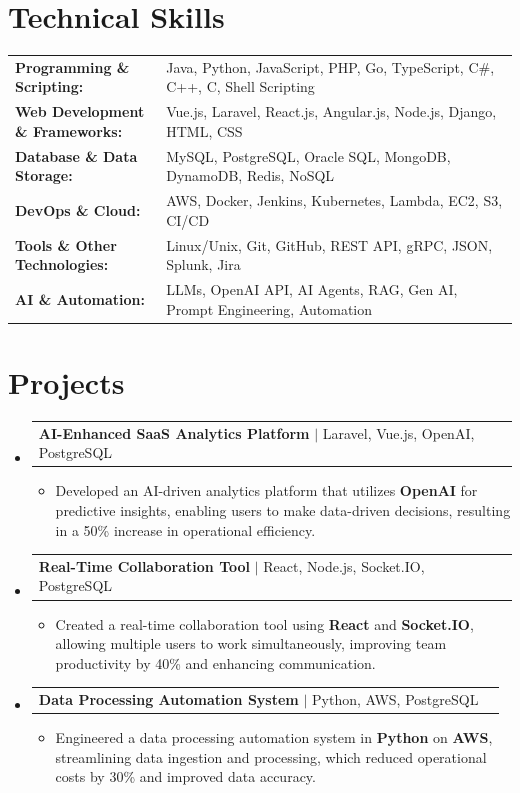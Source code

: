 \documentclass[letterpaper,10pt]{article}
\makeatletter
\newcommand{\resumeItem}[1]{
  \item{\fontsize{8pt}{9pt}\selectfont
    #1 \vspace{-3pt}
  }
}
\newcommand{\resumeProjectHeading}[2]{
    \item
    \begin{tabular*}{1.001\textwidth}{l@{\extracolsep{\fill}}r}
      \fontsize{8.5pt}{10pt}#1 & \textbf{\fontsize{8.5pt}{10pt} #2}\\
    \end{tabular*}\vspace{-7pt}
}
\newcommand{\resumeSubHeadingListStart}{\begin{itemize}[leftmargin=0pt, label={}]}
\newcommand{\resumeSubHeadingListEnd}{\end{itemize}}
\newcommand{\resumeItemListStart}{\begin{itemize}[leftmargin=*]}
\newcommand{\resumeItemListEnd}{\end{itemize}\vspace{-5pt}}
\makeatother
\begin{document}
\section{Technical Skills}
        \vspace{-14pt}
        \begin{table}[h]
            \fontsize{8pt}{9pt}\selectfont
            \begin{tabular}{p{0.3\linewidth} p{0.7\linewidth}}
                \textbf{Programming \& Scripting:} & Java, Python, JavaScript, PHP, Go, TypeScript, C\#, C++, C, Shell Scripting \\
                \textbf{Web Development \& Frameworks:} & Vue.js, Laravel, React.js, Angular.js, Node.js, Django, HTML, CSS \\
                \textbf{Database \& Data Storage:} & MySQL, PostgreSQL, Oracle SQL, MongoDB, DynamoDB, Redis, NoSQL \\
                \textbf{DevOps \& Cloud:} & AWS, Docker, Jenkins, Kubernetes, Lambda, EC2, S3, CI/CD \\
                \textbf{Tools \& Other Technologies:} & Linux/Unix, Git, GitHub, REST API, gRPC, JSON, Splunk, Jira \\
                \textbf{AI \& Automation:} & LLMs, OpenAI API, AI Agents, RAG, Gen AI, Prompt Engineering, Automation \\
            \end{tabular}
        \end{table}
 \vspace{-18pt}

\section{Projects}
    \vspace{-5pt}
    \resumeSubHeadingListStart
          \resumeProjectHeading
            {\textbf{AI-Enhanced SaaS Analytics Platform} $|$ Laravel, Vue.js, OpenAI, PostgreSQL}{}
            \resumeItemListStart
                \resumeItem{Developed an AI-driven analytics platform that utilizes \textbf{OpenAI} for predictive insights, enabling users to make data-driven decisions, resulting in a 50\% increase in operational efficiency.}
            \resumeItemListEnd
        \vspace{-12pt}
    
        \resumeProjectHeading
            {\textbf{Real-Time Collaboration Tool} $|$ React, Node.js, Socket.IO, PostgreSQL}{}
        \resumeItemListStart
                \resumeItem{Created a real-time collaboration tool using \textbf{React} and \textbf{Socket.IO}, allowing multiple users to work simultaneously, improving team productivity by 40\% and enhancing communication.}
        \resumeItemListEnd
      \vspace{-12pt}
      \resumeProjectHeading
        {\textbf{Data Processing Automation System} $|$ Python, AWS, PostgreSQL}{}
    \resumeItemListStart
            \resumeItem{Engineered a data processing automation system in \textbf{Python} on \textbf{AWS}, streamlining data ingestion and processing, which reduced operational costs by 30\% and improved data accuracy.}
    \resumeItemListEnd
    \resumeSubHeadingListEnd
\end{document}
